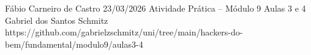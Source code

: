 \documentclass{article}
\begin{document}
{Fábio Carneiro de Castro}
{23/03/2026}
{Atividade Prática -- Módulo 9}
{Aulas 3 e 4}
{Gabriel dos Santos Schmitz}
{https://github.com/gabrielzschmitz/uni/tree/main/hackers-do-bem/fundamental/modulo9/aulas3-4}




\newpage
\printbibliography[title=Referências]
\end{document}
